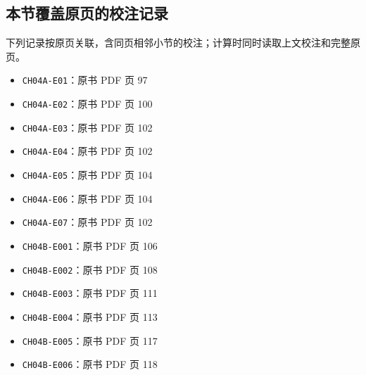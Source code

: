 \documentclass[
  10pt,
  fontset=fandol]{ctexart}
\providecommand{\tightlist}{%
  \setlength{\itemsep}{0pt}\setlength{\parskip}{0pt}}
\begin{document}
\subsection{本节覆盖原页的校注记录}\label{ux672cux8282ux8986ux76d6ux539fux9875ux7684ux6821ux6ce8ux8bb0ux5f55}

下列记录按原页关联，含同页相邻小节的校注；计算时同时读取上文校注和完整原页。

\begin{itemize}
\tightlist
\item
  \texttt{CH04A-E01}：原书 PDF 页 97
\item
  \texttt{CH04A-E02}：原书 PDF 页 100
\item
  \texttt{CH04A-E03}：原书 PDF 页 102
\item
  \texttt{CH04A-E04}：原书 PDF 页 102
\item
  \texttt{CH04A-E05}：原书 PDF 页 104
\item
  \texttt{CH04A-E06}：原书 PDF 页 104
\item
  \texttt{CH04A-E07}：原书 PDF 页 102
\item
  \texttt{CH04B-E001}：原书 PDF 页 106
\item
  \texttt{CH04B-E002}：原书 PDF 页 108
\item
  \texttt{CH04B-E003}：原书 PDF 页 111
\item
  \texttt{CH04B-E004}：原书 PDF 页 113
\item
  \texttt{CH04B-E005}：原书 PDF 页 117
\item
  \texttt{CH04B-E006}：原书 PDF 页 118
\end{itemize}
\end{document}
